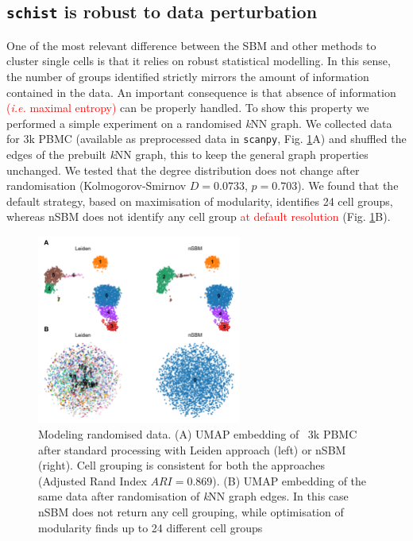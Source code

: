 \documentclass[10pt]{article}
\begin{document}

\subsection*{\texttt{schist} is robust to data perturbation}

One of the most relevant difference between the SBM and other methods to cluster single cells is that it relies on robust statistical modelling. In this sense, the number of groups identified strictly mirrors the amount of information contained in the data. An important consequence is that absence of information \textcolor{red}{(\emph{i.e.} maximal entropy)} can be properly handled. To show this property we performed a simple experiment on a randomised \emph{k}NN graph. We collected data for 3k PBMC (available as preprocessed data in \texttt{scanpy}, Fig. \ref{FigureRandom}A) and shuffled the edges of the prebuilt \emph{k}NN graph, this to keep the general graph properties unchanged. We tested that the degree distribution does not change after randomisation (Kolmogorov-Smirnov $D=0.0733$, $p=0.703$). We found that the default strategy, based on maximisation of modularity, identifies 24 cell groups, whereas nSBM does not identify any cell group \textcolor{red}{at default resolution} (Fig. \ref{FigureRandom}B). 

\begin{figure}[H]
\centering
\includegraphics[keepaspectratio,width=0.6\textwidth,height=\textheight]{FIgure_Random.png}
\caption[]{Modeling randomised data. (A) UMAP embedding of ~3k PBMC after standard processing with Leiden approach (left) or nSBM (right). Cell grouping is consistent for both the approaches (Adjusted Rand Index $ARI=0.869$). (B) UMAP embedding of the same data after randomisation of \emph{k}NN graph edges. In this case nSBM does not return any cell grouping, while optimisation of modularity finds up to 24 different cell groups}\label{FigureRandom}
\end{figure}
\end{document}
